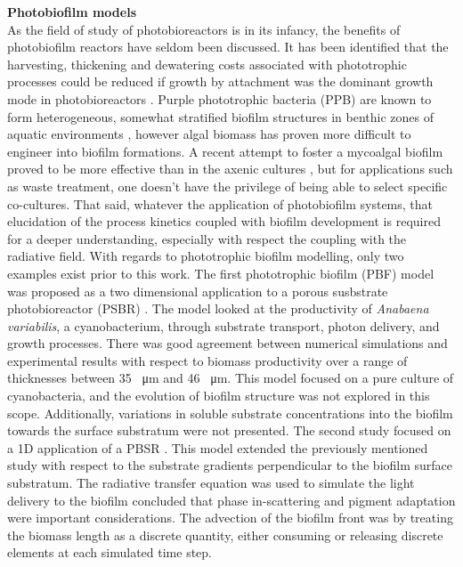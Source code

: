 \textbf{Photobiofilm models}\\
As the field of study of photobioreactors is in its infancy, the benefits of photobiofilm reactors have seldom been discussed. It has been identified that the harvesting, thickening and dewatering costs associated with phototrophic processes could be reduced if growth by attachment was the dominant growth mode in photobioreactors  \cite{hulsen2016a}. Purple phototrophic bacteria (PPB) are known to form heterogeneous, somewhat stratified biofilm structures in benthic zones of aquatic environments \cite{overmann2013}, however algal biomass has proven more difficult to engineer into biofilm formations. A recent attempt to foster a mycoalgal biofilm proved to be more effective than in the axenic cultures \cite{rajendran2016}, but for applications such as waste treatment, one doesn't have the privilege of being able to select specific co-cultures. That said, whatever the application of photobiofilm systems, that elucidation of the process kinetics coupled with biofilm development is required for a deeper understanding, especially with respect the coupling with the radiative field.
\skippingparagraph
With regards to phototrophic biofilm modelling, only two examples exist prior to this work. The first phototrophic biofilm (PBF) model was proposed as a two dimensional application to a porous susbstrate photobioreactor (PSBR) \cite{murphy2014}. The model looked at the productivity of \textit{Anabaena variabilis}, a cyanobacterium, through substrate transport, photon delivery, and growth processes. There was good agreement between numerical simulations and experimental results with respect to biomass productivity over a range of thicknesses between 35 \SI{}{\micro\metre} and 46 \SI{}{\micro\metre}. This model focused on a pure culture of cyanobacteria, and the evolution of biofilm structure was not explored in this scope. Additionally, variations in soluble substrate concentrations into the biofilm towards the surface substratum were not presented. 
\skippingparagraph
The second study focused on a 1D application of a PBSR \cite{li2016}. This model extended the previously mentioned study with respect to the substrate gradients perpendicular to the biofilm surface substratum. The radiative transfer equation was used to simulate the light delivery to the biofilm concluded that phase in-scattering and pigment adaptation were important considerations. The advection of the biofilm front was by treating the biomass length as a discrete quantity, either consuming or releasing discrete elements at each simulated time step. \skippingparagraph


